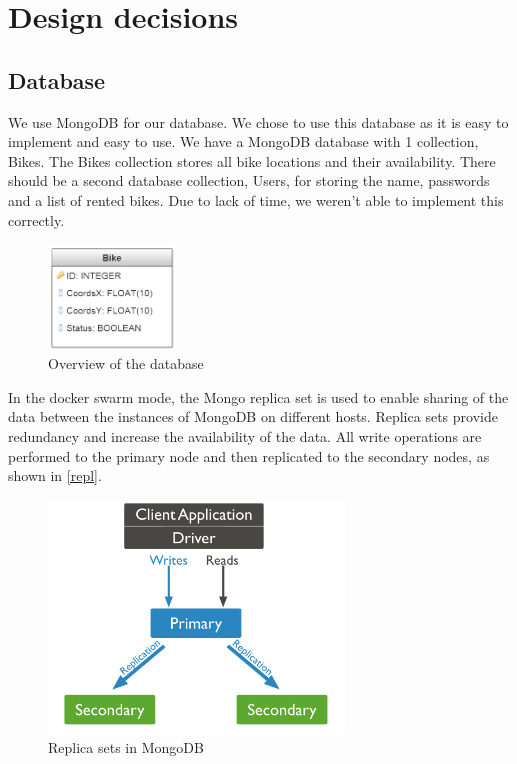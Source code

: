 \section{Design decisions}

\subsection{Database} \label{db_disc}
We use MongoDB for our database. We chose to use this database as it is easy to implement and easy to use. We have
a MongoDB database with 1 collection, Bikes. The Bikes collection stores all bike locations and their availability. There should be a second database collection, Users, for storing the name, passwords and a list of rented bikes. Due to lack of time, we weren't able to implement this correctly.

    \begin{figure}[H]
		\centering
		\includegraphics[width=0.3\textwidth]{images/db-structure.png}
		\caption{Overview of the database}
		\label{database}
	\end{figure}


In the docker swarm mode, the Mongo replica set is used to enable sharing of the data between the instances of MongoDB on different hosts. Replica sets provide redundancy and increase the availability of the data. All write operations are performed to the primary node and then replicated to the secondary nodes, as shown in \autoref{repl}.

    \begin{figure}[H]
		\centering
		\includegraphics[width=0.7\textwidth]{images/replication.png}
		\caption{Replica sets in MongoDB}
		\label{repl}
	\end{figure}


